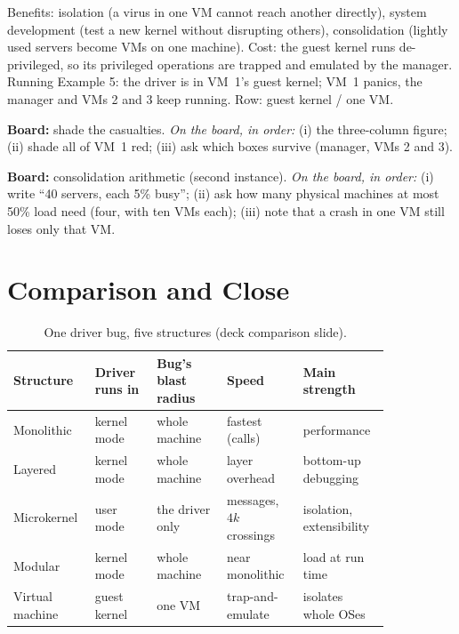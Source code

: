 \documentclass[11pt]{article}
\begin{document}
Benefits: isolation (a virus in one VM cannot reach another directly), system development (test a new kernel without disrupting others), consolidation (lightly used servers become VMs on one machine). Cost: the guest kernel runs de-privileged, so its privileged operations are trapped and emulated by the manager. Running Example 5: the driver is in VM~1's guest kernel; VM~1 panics, the manager and VMs 2 and 3 keep running. Row: guest kernel / one VM.

\textbf{Board:} shade the casualties. \emph{On the board, in order:} (i) the three-column figure; (ii) shade all of VM~1 red; (iii) ask which boxes survive (manager, VMs 2 and 3).

\textbf{Board:} consolidation arithmetic (second instance). \emph{On the board, in order:} (i) write ``40 servers, each 5\% busy''; (ii) ask how many physical machines at most 50\% load need (four, with ten VMs each); (iii) note that a crash in one VM still loses only that VM.

\section{Comparison and Close}

\begin{table}[h]
\centering
\small
\renewcommand{\arraystretch}{1.3}
\begin{tabular}{@{}>{\raggedright\arraybackslash}p{0.14\linewidth}>{\raggedright\arraybackslash}p{0.15\linewidth}>{\raggedright\arraybackslash}p{0.17\linewidth}>{\raggedright\arraybackslash}p{0.18\linewidth}>{\raggedright\arraybackslash}p{0.20\linewidth}@{}}
\toprule
\textbf{Structure} & \textbf{Driver runs in} & \textbf{Bug's blast radius} & \textbf{Speed} & \textbf{Main strength} \\
\midrule
Monolithic & kernel mode & whole machine & fastest (calls) & performance \\
Layered & kernel mode & whole machine & layer overhead & bottom-up debugging \\
Microkernel & user mode & the driver only & messages, $4k$ crossings & isolation, extensibility \\
Modular & kernel mode & whole machine & near monolithic & load at run time \\
Virtual machine & guest kernel & one VM & trap-and-emulate & isolates whole OSes \\
\bottomrule
\end{tabular}
\caption{One driver bug, five structures (deck comparison slide).}
\label{tab:compare}
\end{table}
\end{document}
